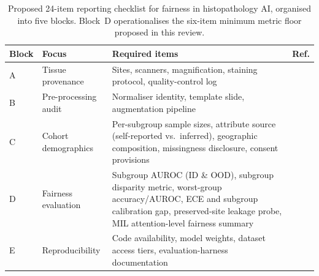 \begin{table}[htbp]
  \centering
  \caption{Proposed 24-item reporting checklist for fairness in histopathology AI,
           organised into five blocks. Block~D operationalises the six-item
           minimum metric floor proposed in this review.}
  \label{tab:checklist}
  \small
  \begin{tabularx}{\linewidth}{@{}l l X l@{}}
    \toprule
    \textbf{Block} & \textbf{Focus} & \textbf{Required items} & \textbf{Ref.} \\
    \midrule
    A & Tissue provenance
      & Sites, scanners, magnification, staining protocol, quality-control log
      & \citep{howard2021site, komen2024batch} \\[2pt]
    B & Pre-processing audit
      & Normaliser identity, template slide, augmentation pipeline
      & \citep{lin2025stain, voon2023evaluating} \\[2pt]
    C & Cohort demographics
      & Per-subgroup sample sizes, attribute source (self-reported vs.\ inferred),
        geographic composition, missingness disclosure, consent provisions
      & \citep{vaidya2024demographic, celi2022sources} \\[2pt]
    D & Fairness evaluation
      & Subgroup AUROC (ID \& OOD), subgroup disparity metric, worst-group
        accuracy/AUROC, ECE and subgroup calibration gap, preserved-site
        leakage probe, MIL attention-level fairness summary
      & \citep{zong2023medfair, vaidya2024demographic, roschewitz2023automatic, howard2021site, chen2023algorithmic} \\[2pt]
    E & Reproducibility
      & Code availability, model weights, dataset access tiers,
        evaluation-harness documentation
      & \citep{koh2021wilds, zong2023medfair} \\
    \bottomrule
  \end{tabularx}
\end{table}

